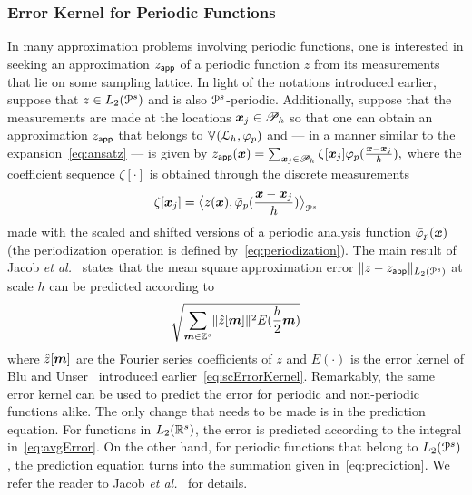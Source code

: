 \subsubsection{Error Kernel for Periodic Functions}
\label{sec:periodicErrorKernel}
In many approximation problems involving periodic functions, one is interested
in seeking an approximation $z_{\mathsf{app}}$ of a periodic function $z$ from its
measurements that lie on some sampling lattice. In light of the notations
introduced earlier, suppose that $z \in L_2(\mathcal{P}^s)$ and is also
$\mathcal{P}^s$-periodic. Additionally, suppose that the measurements are made at the
locations $\boldsymbol{x}_j \in \mathscr{P}_h$ so that one can obtain an
approximation $z_{\mathsf{app}}$ that belongs to  $\mathbb{V}({\mathcal{L}_h},{\varphi_p})$
and --- in a manner similar to the expansion~\eqref{eq:ansatz} --- is given by
$
  z_{\mathsf{app}}(\boldsymbol{x}) = \sum_{\boldsymbol{x}_j \in \mathscr{P}_h}
  \zeta[\boldsymbol{x}_j] \varphi_p(\frac{\boldsymbol{x}-\boldsymbol{x}_j}{h}),
$
where the
coefficient sequence $\zeta[\cdot]$ is obtained through the discrete
measurements
\begin{equation}
  \zeta[\vect{x}_j] = \innerproduct{z(\vect{x})}{\analysis{\varphi}_p(\frac{\vect{x} - \vect{x}_j}{h})}
\label{eq:measurements}
\end{equation}
made with the scaled and shifted versions of a periodic analysis
function ${\bar{\varphi}}_p(\boldsymbol{x})$ (the periodization operation
is defined by~\eqref{eq:periodization}). The main result of Jacob
\textit{et al.}~\cite{jacob02} states that the mean square
approximation error $\lVert z - z_{\mathsf{app}} \rVert_{L_2(\mathcal{P}^s)}$ at scale $h$ can
be predicted according to
\begin{equation}
  \sqrt{\sum_{\vect{m} \in \ints^s} \norm{\ft{z}[\vect{m}]}^2 E(\frac{h}{2}\vect{m})}
\label{eq:prediction}
\end{equation}
where $\hat{z}[\boldsymbol{m}]$ are the Fourier series coefficients of $z$
and $E(\cdot)$ is the error kernel of Blu and Unser~\cite{blu99}
introduced earlier~\eqref{eq:scErrorKernel}.  Remarkably, the same
error kernel can be used to predict the error for periodic and
non-periodic functions alike. The only change that needs to be made is
in the prediction equation. For functions in $L_2(\mathbb{R}^s)$, the error
is predicted according to the integral in~\eqref{eq:avgError}. On the
other hand, for periodic functions that belong to $L_2(\mathcal{P}^s)$, the
prediction equation turns into the summation given
in~\eqref{eq:prediction}. We refer the reader to Jacob \textit{et
  al.}~\cite{jacob02} for details.


